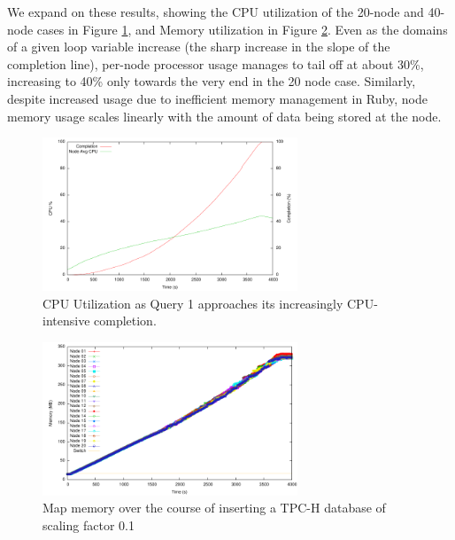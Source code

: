 We expand on these results, showing the CPU utilization of the 20-node and 40-node cases in Figure \ref{fig:20nodes100mbUpdatesVsCPUCompletion}, and Memory utilization in Figure \ref{fig:20nodes100mbUpdatesVsMemory}.  Even as the domains of a given loop variable increase (the sharp increase in the slope of the completion line), per-node processor usage manages to tail off at about 30\%, increasing to 40\% only towards the very end in the 20 node case.  Similarly, despite increased usage due to inefficient memory management in Ruby, node memory usage scales linearly with the amount of data being stored at the node.

\begin{figure}
\begin{center}
\includegraphics[width=3.0in]{images/20nodes100mbUpdatesVsCPUCompletion.pdf}
\caption{CPU Utilization as Query 1 approaches its increasingly CPU-intensive completion.}
\label{fig:20nodes100mbUpdatesVsCPUCompletion}
\end{center}
\end{figure}
\begin{figure}
\begin{center}
\includegraphics[width=3.0in]{images/20nodes100mbUpdatesVsMemory.pdf}
\caption{Map memory over the course of inserting a TPC-H database of scaling factor 0.1}
\label{fig:20nodes100mbUpdatesVsMemory}
\end{center}
\end{figure}

